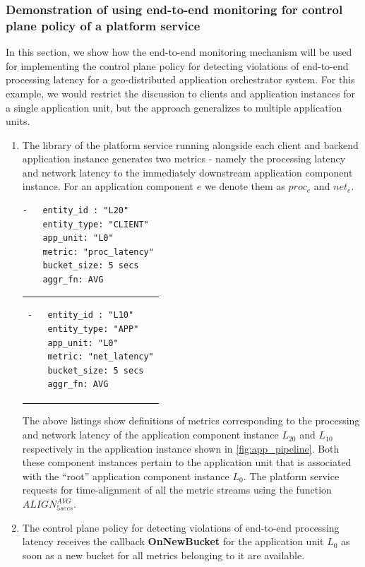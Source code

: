 \subsubsection{Demonstration of using end-to-end monitoring for control plane policy of a platform service}
In this section, we show how the end-to-end monitoring mechanism will be used for implementing the control plane policy for detecting violations of end-to-end processing latency for a geo-distributed application orchestrator system. For this example, we would restrict the discussion to clients and application instances for a single application unit, but the approach generalizes to multiple application units.
\begin{enumerate}
\item The library of the platform service running alongside each client and backend application instance generates two metrics - namely the processing latency and network latency to the immediately downstream application component instance. For an application component $e$ we denote them as $proc_e$ and $net_e$.\\
\begin{minipage}{0.45\textwidth}
\begin{verbatim}
-   entity_id : "L20"
    entity_type: "CLIENT"
    app_unit: "L0"
    metric: "proc_latency"
    bucket_size: 5 secs
    aggr_fn: AVG
\end{verbatim}
\end{minipage}%
\hfill
\begin{minipage}{0.45\textwidth}
\begin{tabular}{p{\textwidth}}
\begin{verbatim}
-   entity_id : "L10"
    entity_type: "APP"
    app_unit: "L0"
    metric: "net_latency"
    bucket_size: 5 secs
    aggr_fn: AVG
\end{verbatim}
\end{tabular}
\end{minipage}

The above listings show definitions of metrics corresponding to the processing and network latency of the application component instance $L_{20}$ and $L_{10}$ respectively in the application instance shown in \cref{fig:app_pipeline}. Both these component instances pertain to the application unit that is associated with the ``root'' application component instance $L_0$. The platform service requests for time-alignment of all the metric streams using the function $ALIGN^{AVG}_{5secs}$. 
\item The control plane policy for detecting violations of end-to-end processing latency receives the callback \textbf{OnNewBucket} for the application unit $L_0$ as soon as a new bucket for all metrics belonging to it are available. 


\end{enumerate}
